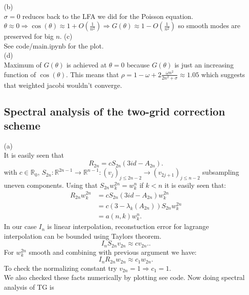 \documentclass[a4paper,12pt]{article}
\begin{document}
(b) \\
$\sigma = 0$ reduces back to the LFA we did for the Poisson equation.
$\theta \approx 0 \Rightarrow \cos(\theta)
    \approx 1 + O \left(\frac{1}{n^{2}}\right) \Rightarrow G(\theta) \approx 1 - O \left(\frac{1}{n^{2}}\right)$
so smooth modes are preserved for big $n$.
(c) \\
See code/main.ipynb for the plot. \\

(d)\\
Maximum of $G(\theta)$ is achieved at $\theta =0$ because $G(\theta)$ is just
an increasing function of $\cos(\theta)$. This means that
$\rho = 1-\omega + 2 \frac{\omega n^{2}}{2 n^{2} + \sigma}  \approx 1.05 $
which suggests that weighted jacobi wouldn't converge.


\subsection{Spectral analysis of the two-grid correction scheme}
(a) \\
It is easily seen that
\begin{equation}
    R_{2n} =  c S_{2n} (3id -A_{2n}).
\end{equation}
with $c \in \mathbb{R}_{0}$, $S_{2n}: \mathbb{R}^{2n-1} \rightarrow \mathbb{R}^{n-1}: (v_{j})_{j \leq 2n-2}
    \rightarrow (v_{2j+1})_{j \leq n-2}$  subsampling uneven components.
Using that $S_{2n}w_{k}^{2n} = w_{k}^{n}$ if $k<n$ it is easily seen that:
\begin{align*}
    R_{2n} w_{k}^{2n} & = cS_{2n}(3id- A_{2n}) w_{k}^{2n}             \\
                      & = c(3- \lambda_{k}(A_{2n})) S_{2n} w_{k}^{2n} \\
                      & = a(n,k) w_{k}^{n} .
\end{align*}
In our case $I_{n}$ is linear interpolation, reconstuction error for lagrange interpolation can be bounded
using Taylors theorem.
\begin{equation}
    I_{n} S_{2n} v_{2n}  \approx c v_{2n}.
    .
\end{equation}
For $w_{k}^{2n}$ smooth and combining with previous argument we have:
\begin{equation}
    I_{n} R_{2n} w_{2n}  \approx c_{1} w_{2n}.
\end{equation}
To check the normalizing constant try $v_{2n} = 1 \Rightarrow c_{1} =1$. \\
We also checked these facts numerically by plotting see code. Now doing spectral analysis of TG is
\end{document}
